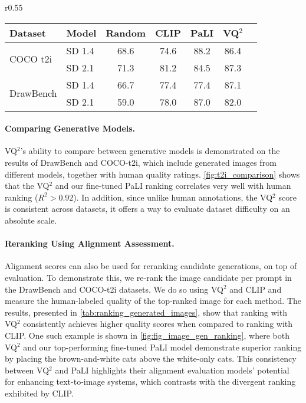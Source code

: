 \documentclass{article}
\newcommand{\VQSQR}[0]{VQ$^2$\xspace}
\begin{document}
\begin{wraptable}{r}{0.55\textwidth}
\footnotesize
\centering
\caption{Comparison of human-labeled quality scores for top-ranked images with model breakdown}
\label{tab:ranking_generated_images}
\begin{tabular}{@{}llccccc@{}}
\toprule
Dataset   & Model & Random & CLIP & PaLI & VQ$^2$ \\ \midrule
\multirow{2}{*}{COCO t2i} 
                          & SD 1.4 & 68.6 & 74.6 & 88.2 & 86.4 \\
                          & SD 2.1 & 71.3 & 81.2 & 84.5 & 87.3 \\ \midrule
\multirow{2}{*}{DrawBench}  
                           & SD 1.4 & 66.7 & 77.4 & 77.4 & 87.1 \\
                           & SD 2.1 & 59.0 & 78.0 & 87.0 & 82.0 \\ \bottomrule
\end{tabular}
\end{wraptable}
 
\paragraph{Comparing Generative Models.} \VQSQR's ability to compare between generative models is demonstrated on the results of DrawBench and COCO-t2i, which include generated images from different models, together with human quality ratings.
\cref{fig:t2i_comparison} shows that the \VQSQR and our fine-tuned PaLI ranking correlates very well with human ranking ($R^2>0.92$). In addition, since unlike human annotations, the \VQSQR score is consistent across datasets, it offers a way to evaluate dataset difficulty on an absolute scale. 

\paragraph{Reranking Using Alignment Assessment.} Alignment scores can also be used for reranking candidate generations, on top of evaluation. To demonstrate this, we re-rank the image candidate per prompt in the DrawBench and COCO-t2i datasets. We do so using \VQSQR and CLIP and measure the human-labeled quality of the top-ranked image for each method. The results, presented in \cref{tab:ranking_generated_images}, show that ranking with \VQSQR consistently achieves higher quality scores when compared to ranking with CLIP. One such example is shown in \cref{fig:fig_image_gen_ranking}, where both \VQSQR and our top-performing fine-tuned PaLI model demonstrate superior ranking by placing the brown-and-white cats above the white-only cats. This consistency between \VQSQR and PaLI highlights their alignment evaluation models' potential for enhancing text-to-image systems, which contrasts with the divergent ranking exhibited by CLIP.
\end{document}

